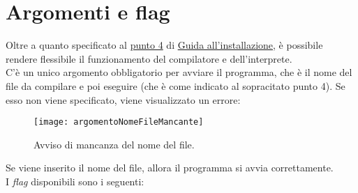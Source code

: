 \documentclass[../report.tex]{subfiles}
\begin{document}
\section{Argomenti e flag}\label{s:argomenti-flag}
Oltre a quanto specificato al \hyperref[a:pt4]{punto 4} di \hyperref[a:installazione]{Guida all'installazione}, è possibile rendere flessibile il funzionamento del compilatore e dell'interprete.\\
C'è un unico argomento obbligatorio per avviare il programma, che è il nome del file da compilare e poi eseguire (che è come indicato al sopracitato punto 4). Se esso non viene specificato, viene visualizzato un errore:
\begin{figure}[H]
    \centering
    \texttt{[image: argomentoNomeFileMancante]}
    \caption{Avviso di mancanza del nome del file.}
    \label{fig:argomento-nome-file-mancante}
\end{figure}
Se viene inserito il nome del file, allora il programma si avvia correttamente.\\
I \textit{flag} disponibili sono i seguenti:
\end{document}
